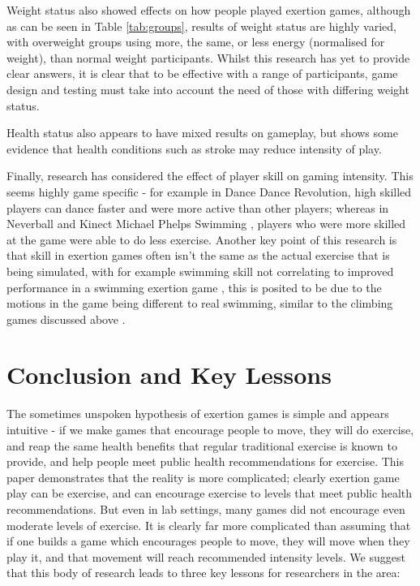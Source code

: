Weight status also showed effects on how people played exertion games, although as can be seen in Table \ref{tab:groups}, results of weight status are highly varied, with overweight groups using more, the same, or less energy (normalised for weight), than normal weight participants. Whilst this research has yet to provide clear answers, it is clear that to be effective with a range of participants,  game design and testing must take into account the need of those with differing weight status.

Health status also appears to have mixed results on gameplay, but shows some evidence that health conditions such as stroke may reduce intensity of play.

Finally, research has considered the effect of player skill on gaming intensity. This seems highly game specific - for example in Dance Dance Revolution, high skilled players can dance faster and were more active than other players; whereas in Neverball \cite{Berkovsky2012PhysicalReward} and Kinect Michael Phelps Swimming \cite{Soltani2017PhysiologicalExperience}, players who were more skilled at the game were able to do less exercise. Another key point of this research is that skill in exertion games often isn't the same as the actual exercise that is being simulated, with for example swimming skill not correlating to improved performance in a swimming exertion game \cite{Soltani2017PhysiologicalExperience}, this is posited to be due to the motions in the game being different to real swimming, similar to the climbing games discussed above \cite{Jenny2015VirtualPerceptions}.

\section{Conclusion and Key Lessons}

The sometimes unspoken hypothesis of exertion games is simple and appears intuitive - if we make games that encourage people to move, they will do exercise, and reap the same health benefits that regular traditional exercise is known to provide, and help people meet public health recommendations for exercise. This paper demonstrates that the reality is more complicated; clearly exertion game play can be exercise, and can encourage exercise to levels that meet public health recommendations. But even in lab settings, many games did not encourage even moderate levels of exercise. It is clearly far more complicated than assuming that if one builds a game which encourages people to move, they will move when they play it, and that movement will reach recommended intensity levels. We suggest that this body of research leads to three key lessons for researchers in the area:

